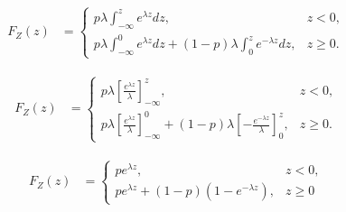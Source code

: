\documentclass[answers]{exam}
\begin{document}
\begin{questions}
\begin{parts}
\begin{solution}
            \begin{align*}
                F_Z(z) & = \begin{cases}
                               p \lambda \int_{-\infty}^{z} e^{\lambda z} dz,                                                  & z < 0,   \\
                               p \lambda \int_{-\infty}^{0} e^{\lambda z} dz + (1 - p) \lambda \int_{0}^{z} e^{-\lambda z} dz, & z \ge 0.
                           \end{cases}
            \end{align*}

            \begin{align*}
                F_Z(z) & = \begin{cases}
                               p \lambda \left[\frac{e^{\lambda z}}{\lambda}\right]_{-\infty}^{z},                                                                        & z < 0,   \\
                               p \lambda \left[\frac{e^{\lambda z}}{\lambda}\right]_{-\infty}^{0} + (1 - p) \lambda \left[-\frac{e^{-\lambda z}}{\lambda}\right]_{0}^{z}, & z \ge 0.
                           \end{cases}
            \end{align*}

            \begin{align*}
                F_Z(z) & = \begin{cases}
                               p e^{\lambda z},                                                                & z < 0,  \\
                               p e^{\lambda z} + (1 - p) (1 - e^{-\lambda z}), & z \ge 0
                           \end{cases}
            \end{align*}
        \end{solution}
    \end{parts}
\end{questions}
\end{document}

